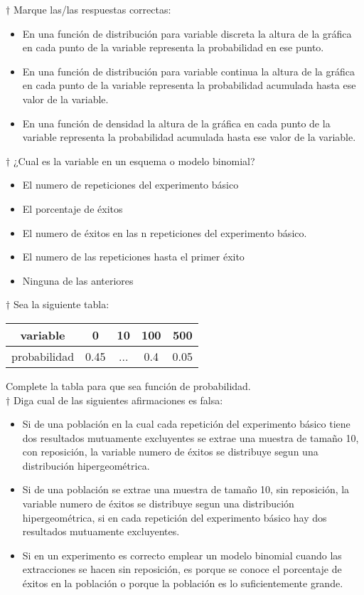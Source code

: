 \documentclass[10pt,a4paper]{article}
\begin{document}
$\dagger$  Marque las/las respuestas correctas:

\begin{itemize}
	\renewcommand{\labelitemi}{\raisebox{-.25\height}{\huge$\square$}}
	\item En una función de distribución para variable discreta la altura de la gráfica en cada punto de la variable representa la probabilidad en ese punto.
	\item En una función de distribución para variable continua la altura de la gráfica en cada punto de la variable representa la probabilidad acumulada hasta ese valor de la variable.
	\item En una función de densidad la altura de la gráfica en cada punto de la variable representa la probabilidad acumulada hasta ese valor de la variable.
\end{itemize}

$\dagger$ ¿Cual es la variable en un esquema o modelo binomial?
\begin{itemize}
	\renewcommand{\labelitemi}{\raisebox{-.25\height}{\huge$\square$}}
	\item El numero de repeticiones del experimento básico
	\item El porcentaje de éxitos
	\item El numero de éxitos en las n repeticiones del experimento básico.
	\item El numero de las repeticiones hasta el primer éxito
	\item Ninguna de las anteriores
\end{itemize}
$\dagger$ Sea la siguiente tabla:
\begin{center}
	\begin{tabular}{|c|c|c|c|c|}
		\hline 
		variable & 0 & 10 & 100 & 500 \\ 
		\hline 
		probabilidad & 0.45 & ... & 0.4 & 0.05 \\ 
		\hline 
	\end{tabular}
\end{center} 
Complete la tabla para que sea función de probabilidad.
\\
$\dagger$ Diga cual de las siguientes afirmaciones es falsa:
\begin{itemize}
	\renewcommand{\labelitemi}{\raisebox{-.25\height}{\huge$\square$}}
	\item Si de una población en la cual cada repetición del experimento básico tiene dos resultados mutuamente excluyentes se extrae una muestra de tamaño 10, con reposición, la variable numero de éxitos se distribuye segun una distribución hipergeométrica.
	\item Si de una población se extrae una muestra de tamaño 10, sin reposición, la variable numero de éxitos se distribuye segun una distribución hipergeométrica, si en cada repetición del experimento básico hay dos resultados mutuamente excluyentes.
	\item Si en un experimento es correcto emplear un modelo binomial cuando las extracciones se hacen sin reposición, es porque se conoce el porcentaje de éxitos en la población o porque la población es lo suficientemente grande.
\end{itemize}
\end{document}
